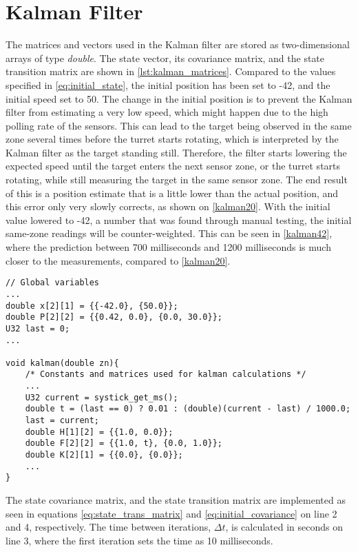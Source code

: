 \section{Kalman Filter} \label{imp:kalman}
The matrices and vectors used in the Kalman filter are stored as two-dimensional arrays of type \emph{double}. The state vector, its covariance matrix, and the state transition matrix are shown in \cref{lst:kalman_matrices}. Compared to the values specified in \cref{eq:initial_state}, the initial position has been set to -42, and the initial speed set to 50. The change in the initial position is to prevent the Kalman filter from estimating a very low speed, which might happen due to the high polling rate of the sensors. This can lead to the target being observed in the same zone several times before the turret starts rotating, which is interpreted by the Kalman filter as the target standing still. Therefore, the filter starts lowering the expected speed until the target enters the next sensor zone, or the turret starts rotating, while still measuring the target in the same sensor zone. The end result of this is a position estimate that is a little lower than the actual position, and this error only very slowly corrects, as shown on \cref{kalman20}. With the initial value lowered to -42, a number that was found through manual testing, the initial same-zone readings will be counter-weighted. This can be seen in \cref{kalman42}, where the prediction between 700 milliseconds and 1200 milliseconds is much closer to the measurements, compared to \cref{kalman20}.




\begin{lstlisting}[style=customc, label={lst:kalman_matrices}, caption={Matrices used in the Kalman filter.}]
// Global variables
...
double x[2][1] = {{-42.0}, {50.0}};
double P[2][2] = {{0.42, 0.0}, {0.0, 30.0}};
U32 last = 0;
...

void kalman(double zn){
    /* Constants and matrices used for kalman calculations */
    ...
    U32 current = systick_get_ms();
    double t = (last == 0) ? 0.01 : (double)(current - last) / 1000.0;
    last = current;
    double H[1][2] = {{1.0, 0.0}};
    double F[2][2] = {{1.0, t}, {0.0, 1.0}};
    double K[2][1] = {{0.0}, {0.0}};
    ...
}
\end{lstlisting}

The state covariance matrix, and the state transition matrix are implemented as seen in equations \ref{eq:state_trans_matrix} and \ref{eq:initial_covariance} on line 2 and 4, respectively. The time between iterations, $\Delta t$, is calculated in seconds on line 3, where the first iteration sets the time as 10 milliseconds. \\

